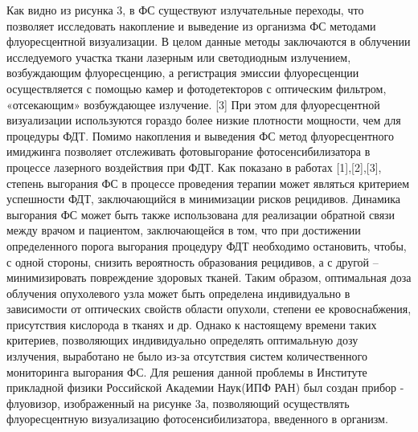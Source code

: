 \documentclass[a4paper,14pt]{extarticle}
\begin{document}
Как видно из рисунка 3, в ФС существуют излучательные переходы, что позволяет исследовать накопление и выведение из организма ФС методами флуоресцентной визуализации. В целом данные методы заключаются в облучении исследуемого участка ткани лазерным или светодиодным излучением, возбуждающим флуоресценцию, а регистрация эмиссии  флуоресценции осуществляется с помощью камер и фотодетекторов с оптическим фильтром, «отсекающим» возбуждающее излучение. [3] При этом для флуоресцентной визуализации используются гораздо более низкие плотности мощности, чем для процедуры ФДТ.
Помимо накопления и выведения ФС метод флуоресцентного имиджинга позволяет отслеживать фотовыгорание фотосенсибилизатора в процессе лазерного воздействия при ФДТ. Как показано в работах [1],[2],[3], степень выгорания ФС в процессе проведения терапии может являться критерием успешности ФДТ, заключающийся в минимизации рисков рецидивов. Динамика выгорания ФС может быть также использована для реализации обратной связи между врачом и пациентом, заключающейся в том, что при достижении определенного порога выгорания процедуру ФДТ необходимо остановить, чтобы, с одной стороны, снизить вероятность образования рецидивов, а с другой – минимизировать повреждение здоровых тканей. Таким образом, оптимальная доза облучения опухолевого узла может быть определена индивидуально в зависимости от оптических свойств области опухоли, степени ее кровоснабжения, присутствия кислорода в тканях и др. Однако к настоящему времени таких критериев, позволяющих индивидуально определять оптимальную дозу излучения, выработано не было из-за отсутствия систем количественного мониторинга выгорания ФС.
Для решения данной проблемы в Институте прикладной физики Российской Академии Наук(ИПФ РАН) был создан прибор - флуовизор, изображенный на рисунке 3а, позволяющий осуществлять флуоресцентную визуализацию фотосенсибилизатора, введенного в организм.
\end{document}

